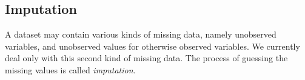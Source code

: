\documentclass{article}\usepackage[]{graphicx}\usepackage[]{color}
\newcommand{\Robject}[1]{{\texttt{#1}}}
\newcommand{\Rmethod}[1]{{\texttt{#1}}}
\newcommand{\Rclass}[1]{{\textit{#1}}}
\begin{document}
% 
% 
% 
% 
% 

\subsection{Imputation}\label{sec:imputation}
A dataset may contain various kinds of missing data, namely unobserved variables,
and unobserved values for otherwise observed variables. We currently deal only with this
second kind of missing data. The process of guessing the missing values is called \emph{imputation}.
\end{document}
